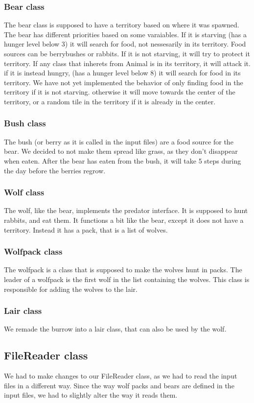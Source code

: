 \documentclass[11pt]{article}
\begin{document}
    \subsubsection*{Bear class}
    The bear class is supposed to have a territory based on where it was spawned. The bear has different priorities based on some varaiables. 
    If it is starving (has a hunger level below 3) it will search for food, not nessesarily in its territory. Food sources can be berrybushes or rabbits. 
    If it is not starving, it will try to protect it territory. If any class that inherets from Animal is in its territory, it will attack it. 
    if it is instead hungry, (has a hunger level below 8) it will search for food in its territory. We have not yet implemented the behavior of only 
    finding food in the territory if it is not starving. otherwise it will move towards the center of the territory, or a random tile in the territory if 
    it is already in the center.
    \subsubsection*{Bush class}
    The bush (or berry as it is called in the input files) are a food source for the bear. We decided to not make them spread like grass, as they don't 
    disappear when eaten. After the bear has eaten from the bush, it will take 5 steps during the day before the berries regrow.
    \subsubsection*{Wolf class}
    The wolf, like the bear, implements the predator interface. It is supposed to hunt rabbits, and eat them. It functions a bit like the bear, except 
    it does not have a territory. Instead it has a pack, that is a list of wolves.
    \subsubsection*{Wolfpack class}
    The wolfpack is a class that is supposed to make the wolves hunt in packs. The leader of a wolfpack is the first wolf in the list 
    containing the wolves. This class is responsible for adding the wolves to the lair. 
    \subsubsection*{Lair class}
    We remade the burrow into a lair class, that can also be used by the wolf. 
    \subsection*{FileReader class}
    We had to make changes to our FileReader class, as we had to read the input files in a different way. Since the way wolf packs 
    and bears are defined in the input files, we had to slightly alter the way it reads them. 
\end{document}
